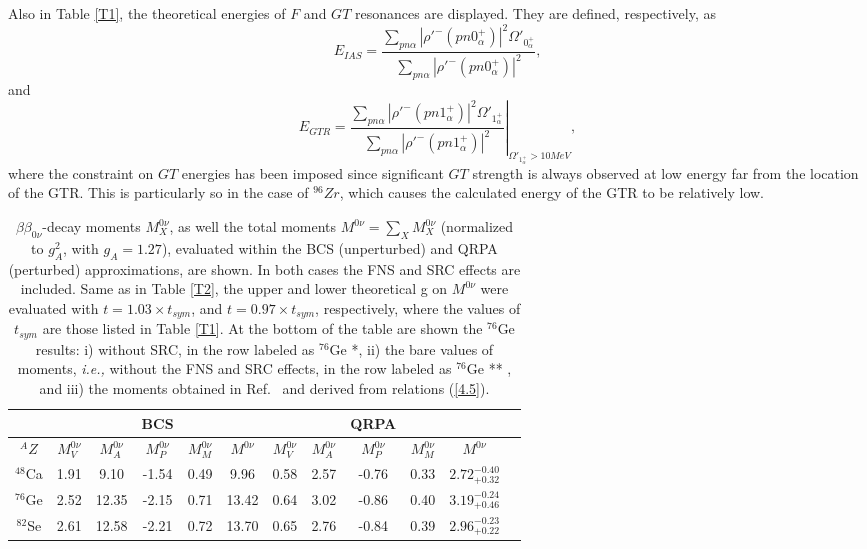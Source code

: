 \documentclass[nofootinbib,twocolumn,eqsecnum,floats,aps]{revtex4}
\def\sss{\scriptscriptstyle}
\def\x{\times}
\def\ie{{\it i.e., }}
\def\be{\begin{equation}}
\def\ee{\end{equation}}
\def\rf#1{{(\ref{#1})}}
\def\a {{\alpha}}
\def\b {{\beta}}
\def\sss{\scriptscriptstyle}
\begin{document}
{Also in Table \ref{T1}, the theoretical energies of $F$ and $GT$
resonances are  displayed. They are defined, respectively, as
\be
E_{IAS}=\frac{\sum_{pn\a}|\rho'^{-}(pn0_\a^+)|^2
\Omega'_{0_\a^+}}{\sum_{pn\a}|\rho'^{-}(pn0_\a^+)|^2},
\label{4.1}\ee
and
\be
E_{GTR}=\left.\frac{\sum_{pn\a} |
\rho'^{-}(pn1_\a^+)|^2\Omega'_{1_\a^+}}
{\sum_{pn\a}|\rho'^{-}(pn1_\a^+)|^2}\right|_{\Omega'_{1_\a^+}>10 MeV},
\label{4.2}\ee
where the constraint on $GT$ energies has been
imposed since significant $GT$ strength is always observed  at low
energy far from the location of  the GTR. This is particularly so in the case of
{$^{96}Zr$}, which causes the calculated energy of the GTR to be relatively low.
\begin{table*}[t]
\begin{center}
\hspace{-.5cm}
\caption {%
$\b\b_{0\nu}$-decay moments $M^{0\nu}_{X}$,
as well the total moments $M^{0\nu}=\sum_X M^{0\nu}_{X}$
(normalized to $g_{\sss A}^2$, with $g_{\sss A}=1.27$), evaluated within the BCS (unperturbed)
and QRPA (perturbed) approximations, are shown. In  both cases
the FNS  and SRC effects  are included. Same as in  Table \ref{T2}, the upper and lower theoretical g on $M^{0\nu}$
 were evaluated with $t=1.03\x t_{sym}$,
and $t=0.97\x t_{sym}$, respectively, where the values of  $t_{sym}$
are those listed in Table \ref{T1}.
At the bottom of the table are shown  the  $^{76}$Ge results: i) without SRC,
 in the row labeled as $^{76}$Ge *, ii) the bare values of moments, \ie without the
FNS and SRC effects, in the row labeled as $^{76}$Ge ** , and iii) the moments obtained in
 Ref.~\cite{Hyv15} and derived from relations \rf{4.5}.}
\label{T3}
\bigskip
\begin{tabular}{c|ccccc|cccccc}
\hline
&&&BCS&&&&&QRPA&&&\\
\hline
$^AZ$ & $M^{0\nu}_V$& $M^{0\nu}_A$  &  $M^{0\nu}_P$ &$M^{0\nu}_{M}$ &$M^{0\nu} $
            & $M^{0\nu}_V$& $M^{0\nu}_A$  &  $M^{0\nu}_P$ &$M^{0\nu}_{M}$ &$M^{0\nu}$         \\
\hline
 $^{48}$Ca  & 1.91&  9.10& -1.54&  0.49&    9.96& 0.58& 2.57& -0.76& 0.33& $2.72^{-0.40}_{+0.32}$\\
 $^{76}$Ge  & 2.52& 12.35& -2.15&  0.71&   13.42& 0.64& 3.02& -0.86& 0.40& $3.19^{-0.24}_{+0.46}$\\
 $^{82}$Se  & 2.61& 12.58& -2.21&  0.72&   13.70& 0.65& 2.76& -0.84& 0.39& $2.96^{-0.23}_{+0.22}$\\

\end{tabular}
\end{center}
\end{table*}}
\end{document}
